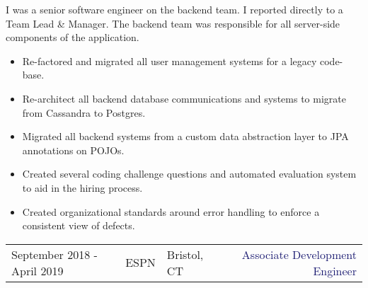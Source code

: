 \documentclass{article}
\begin{document}
\vspace{3pt} I was a senior software engineer on the backend team. I reported directly to a Team Lead \& Manager. The backend team was responsible for all server-side components of the application. 
\begin{multicols}{2}
  \begin{small}
    \begin{itemize}[leftmargin=*,label=\tiny{$\bullet$}]
    \item\begin{minipage}[t]{\linewidth}{Re-factored and migrated all user management systems for a legacy code-base.}\end{minipage}
    \item\begin{minipage}[t]{\linewidth}{Re-architect all backend database communications and systems to migrate from Cassandra to Postgres.}\end{minipage}
    \item\begin{minipage}[t]{\linewidth}{Migrated all backend systems from a custom data abstraction layer to JPA annotations on POJOs.}\end{minipage}
    \item\begin{minipage}[t]{\linewidth}{Created several coding challenge questions and automated evaluation system to aid in the hiring process.}\end{minipage}
    \item\begin{minipage}[t]{\linewidth}{Created organizational standards around error handling to enforce a consistent view of defects.}\end{minipage}
    \end{itemize}
  \end{small} 
\end{multicols}

\vspace{15pt}\begin{tabularx}{\textwidth}{@{}lllXr}
  September 2018 - April 2019&\textcolor{Mahogany}{ESPN}&\textcolor{Black!80}{Bristol, CT}&&\textcolor{MidnightBlue}{Associate Development Engineer}
\end{tabularx}
\end{document}
